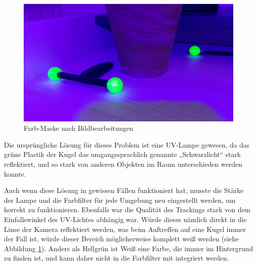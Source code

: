 \documentclass[12pt, ngerman]{article}
\begin{document}
\begin{figure}
  \includegraphics[angle=0,width=\linewidth]{2d-uv-normal.jpg}
  \caption{Farb-Maske nach Bildbearbeitungen}
  \label{Abb: UV}
\end{figure}
Die ursprüngliche Lösung für dieses Problem ist eine UV-Lampe gewesen, da das grüne Plastik der Kugel das umgangssprachlich genannte „Schwarzlicht“ stark reflektiert, und so stark von anderen Objekten im Raum unterschieden werden konnte. 

Auch wenn diese Lösung in gewissen Fällen funktioniert hat, musste die Stärke der Lampe und die Farbfilter für jede Umgebung neu eingestellt werden, um korrekt zu funktionieren. Ebenfalls war die Qualität des Trackings stark von dem Einfallswinkel des UV-Lichtes abhängig war. Würde dieses nämlich direkt in die Linse der Kamera reflektiert werden, was beim Auftreffen auf eine Kugel immer der Fall ist, würde dieser Bereich möglicherweise komplett weiß werden (siehe Abbildung \ref{Abb: UV}). Anders als Hellgrün ist Weiß eine Farbe, die immer im Hintergrund zu finden ist, und kann daher nicht in die Farbfilter mit integriert werden. 
\end{document}
